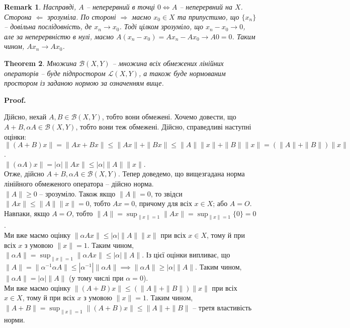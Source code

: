 \documentclass[a4paper, 10pt]{article}
\makeatletter
\def\rightproof{$\boxed{\Rightarrow}$ }
\def\leftproof{$\boxed{\Leftarrow}$ }
\theoremstyle{theoremdd}
\newtheorem{theorem}{Theorem}[subsection]
\theoremstyle{theoremdd}
\theoremstyle{theoremdd}
\theoremstyle{theoremdd}
\theoremstyle{theoremdd}
\theoremstyle{theoremdd}
\newtheorem{remark}[theorem]{Remark}
\theoremstyle{theoremdd}
\theoremstyle{theoremdd}
\renewenvironment{proof}[1][Proof.\\]{\par
\pushQED{\hfill \qed}%
\normalfont \topsep6\p@\@plus6\p@\relax
\trivlist
\item\relax
{\bfseries
#1\@addpunct{.}}\hspace\labelsep\ignorespaces
}{%
\popQED\endtrivlist\@endpefalse
}
\makeatother
\begin{document}
\begin{remark}
Насправді, $A$ -- неперервний в точці $0 \iff A$ -- неперервний на $X$.\\
Сторона \leftproof зрозуміла. По стороні \rightproof маємо $x_0 \in X$ та припустимо, що $\{x_n\}$ -- довільна послідовність, де $x_n \to x_0$. Тоді цілком зрозуміло, що $x_n - x_0 \to 0$, але за неперервністю в нулі, маємо $A(x_n - x_0) = A x_n - A x_0 \to A0 = 0$. Таким чином, $A x_n \to A x_0$.
\end{remark}

\begin{theorem}
Множина $\mathcal{B}(X,Y)$ -- множина всіх обмежених лінійних операторів -- буде підпростором $\mathcal{L}(X,Y)$, а також буде нормованим простором із заданою нормою за означенням вище.
\end{theorem}

\begin{proof}
Дійсно, нехай $A,B \in \mathcal{B}(X,Y)$, тобто вони обмежені. Хочемо довести, що $A+B, \alpha A \in \mathcal{B}(X,Y)$, тобто вони теж обмежені. Дійсно, справедливі наступні оцінки:\\
$\| (A+B) x \| = \| Ax + Bx \| \leq \|Ax \| + \|Bx\| \leq \|A\| \|x\| + \|B\| \|x \| = (\|A\| + \|B\|) \|x\|$.\\
$\| (\alpha A) x \| = |\alpha| \|Ax\| \leq |\alpha| \|A\| \|x\|$.\\
Отже, дійсно $A+B, \alpha A \in \mathcal{B}(X,Y)$. Тепер доведемо, що вищезгадана норма лінійного обмеженого оператора -- дійсно норма.\\
$\|A\| \geq 0$ -- зрозуміло. Також якщо $\|A\| = 0$, то звідси $\|Ax\| \leq \|A\| \|x\| = 0$, тобто $Ax = 0$, причому для всіх $x \in X$; або $A = O$. Навпаки, якщо $A = O$, тобто $\|A\| = \displaystyle\sup_{\|x\| = 1} \|Ax\| = \sup_{\|x\|= 1} \{0\} = 0$.\\
Ми вже маємо оцінку $\| \alpha Ax\| \leq |\alpha| \|A\| \|x\|$ при всіх $x \in X$, тому й при всіх $x$ з умовою $\|x\| = 1$. Таким чином, $\|\alpha A\| = \displaystyle\sup_{\|x\|= 1} \|\alpha Ax\| \leq |\alpha|\|A\|$. Із цієї оцінки випливає, що $\|A\| = \|\alpha^{-1} \alpha A\| \leq |\alpha^{-1}| \|\alpha A\| \implies \|\alpha A\| \geq |\alpha| \|A\|$. Таким чином, $\|\alpha A\| = |\alpha| \|A\|$ (у тому числі при $\alpha = 0$).\\
Ми вже маємо оцінку $\| (A+B) x\| \leq (\|A\| + \|B\|) \|x\|$ при всіх $x \in X$, тому й при всіх $x$ з умовою $\|x\| = 1$. Таким чином, $\|A+B\| = \displaystyle\sup_{\|x\| = 1} \|(A+B)x\| \leq \|A\| + \|B\|$ -- третя властивість норми.
\end{proof}
\end{document}
